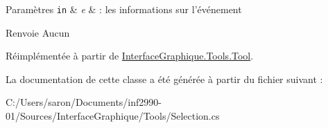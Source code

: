 \begin{DoxyParams}[1]{Paramètres}
\mbox{\tt in}  & {\em e} & \-: les informations sur l'événement\\
\hline
\end{DoxyParams}
\begin{DoxyReturn}{Renvoie}
Aucun 
\end{DoxyReturn}


Réimplémentée à partir de \hyperlink{class_interface_graphique_1_1_tools_1_1_tool_aedd1c93f96ee602475b7cbc3c9c99baa}{Interface\-Graphique.\-Tools.\-Tool}.



La documentation de cette classe a été générée à partir du fichier suivant \-:\begin{DoxyCompactItemize}
\item 
C\-:/\-Users/saron/\-Documents/inf2990-\/01/\-Sources/\-Interface\-Graphique/\-Tools/Selection.\-cs\end{DoxyCompactItemize}

